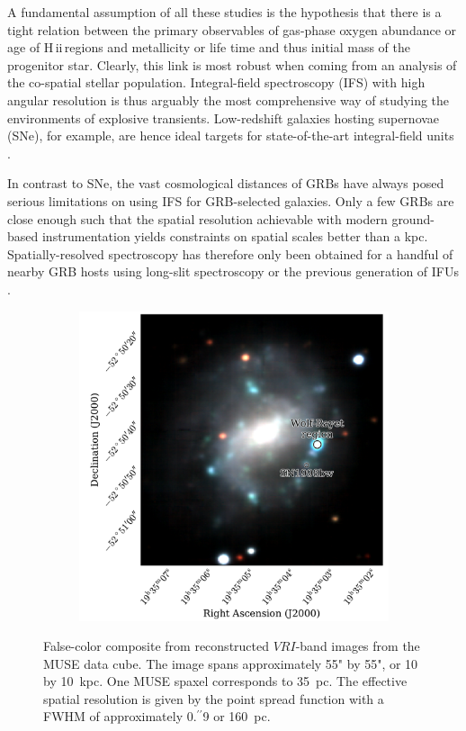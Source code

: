 \documentclass[traditabstract, referee]{aa}
\newcommand{\farc}{\hbox{$.\!\!^{\prime\prime}$}}
\newcommand{\hii}{\mbox{H\,{\sc ii}}}
\begin{document}
A fundamental assumption of all these studies is the hypothesis that there is a tight relation between the primary observables of gas-phase oxygen abundance or age of \hii\,regions and metallicity or life time and thus initial mass of the progenitor star. Clearly, this link is most robust when coming from an analysis of the co-spatial stellar population. Integral-field spectroscopy (IFS) with high angular resolution is thus arguably the most comprehensive way of studying the environments of explosive transients. Low-redshift galaxies hosting supernovae (SNe), for example, are hence ideal targets for state-of-the-art integral-field units \citep[IFUs, e.g.][]{2013AJ....146...30K, 2013AJ....146...31K, 2014A&A...572A..38G}.

In contrast to SNe, the vast cosmological distances of GRBs \citep[e.g.][]{2009ApJS..185..526F, 2009Natur.461.1254T, 2012ApJ...758...46K} have always posed serious limitations on using IFS for GRB-selected galaxies. Only a few GRBs are close enough such that the spatial resolution achievable with modern ground-based instrumentation yields constraints on spatial scales better than a kpc. Spatially-resolved spectroscopy has therefore only been obtained for a handful of nearby GRB hosts using long-slit spectroscopy \citep[e.g.][]{2008ApJ...676.1151T, 2011ApJ...739...23L, 2015A&A...579A.126S} or the previous generation of IFUs \citep{2008A&A...490...45C, 2014MNRAS.441.2034T}.

\begin{figure}
\begin{subfigure}{.48\textwidth}
  \includegraphics[width=0.999\linewidth]{Figs/MUSE_SN1998bw_RGB.pdf}
\end{subfigure}
\caption{False-color composite from reconstructed $VRI$-band images from the MUSE data cube. The image spans approximately 55" by 55", or 10 by 10~kpc. One MUSE spaxel corresponds to 35~pc. The effective spatial resolution is given by the point spread function with a FWHM of approximately 0\farc{9} or 160~pc.}
\label{fig:Host}
\end{figure}
\end{document}

